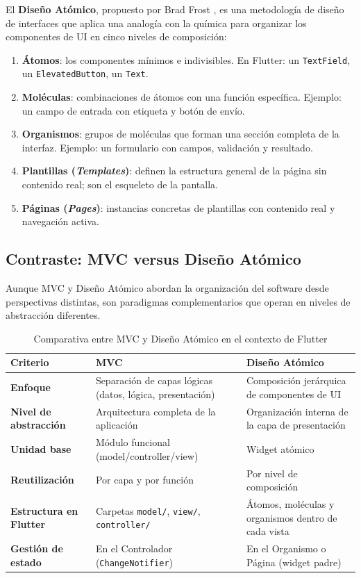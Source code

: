 \documentclass[12pt,a4paper]{article}
\begin{document}
El \textbf{Diseño Atómico}, propuesto por Brad Frost \cite{frost2016}, es una metodología de diseño de interfaces que aplica una analogía con la química para organizar los componentes de UI en cinco niveles de composición:

\begin{enumerate}
  \item \textbf{Átomos}: los componentes mínimos e indivisibles. En Flutter: un \texttt{TextField}, un \texttt{ElevatedButton}, un \texttt{Text}.
  \item \textbf{Moléculas}: combinaciones de átomos con una función específica. Ejemplo: un campo de entrada con etiqueta y botón de envío.
  \item \textbf{Organismos}: grupos de moléculas que forman una sección completa de la interfaz. Ejemplo: un formulario con campos, validación y resultado.
  \item \textbf{Plantillas (\textit{Templates})}: definen la estructura general de la página sin contenido real; son el esqueleto de la pantalla.
  \item \textbf{Páginas (\textit{Pages})}: instancias concretas de plantillas con contenido real y navegación activa.
\end{enumerate}

\subsection{Contraste: MVC versus Diseño Atómico}

Aunque MVC y Diseño Atómico abordan la organización del software desde perspectivas distintas, son paradigmas complementarios que operan en niveles de abstracción diferentes.

\begin{table}[H]
\centering
\caption{Comparativa entre MVC y Diseño Atómico en el contexto de Flutter}
\label{tab:mvc_vs_atomic}
\renewcommand{\arraystretch}{1.4}
\begin{tabular}{>{\bfseries}p{3.2cm} p{5cm} p{5cm}}
\toprule
Criterio & MVC & Diseño Atómico \\
\midrule
Enfoque & Separación de capas lógicas (datos, lógica, presentación) & Composición jerárquica de componentes de UI \\
Nivel de abstracción & Arquitectura completa de la aplicación & Organización interna de la capa de presentación \\
Unidad base & Módulo funcional (model/controller/view) & Widget atómico \\
Reutilización & Por capa y por función & Por nivel de composición \\
Estructura en Flutter & Carpetas \texttt{model/}, \texttt{view/}, \texttt{controller/} & Átomos, moléculas y organismos dentro de cada vista \\
Gestión de estado & En el Controlador (\texttt{ChangeNotifier}) & En el Organismo o Página (widget padre) \\
\bottomrule
\end{tabular}
\end{table}
\end{document}

